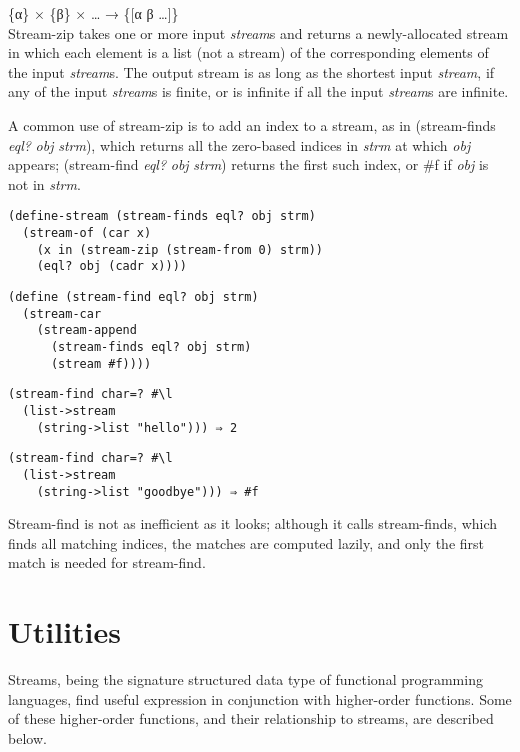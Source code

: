 \begin{entry}{%
  }

  \{α\} × \{β\} × \ldots{} → \{{[}α β \ldots{}{]}\}\\
  Stream-zip takes one or more input \emph{stream}s and returns a
  newly-allocated stream in which each element is a list (not a
  stream) of the corresponding elements of the input
  \emph{stream}s. The output stream is as long as the shortest input
  \emph{stream}, if any of the input \emph{stream}s is finite, or is
  infinite if all the input \emph{stream}s are infinite.

  A common use of stream-zip is to add an index to a stream, as in
  (stream-finds \emph{eql?} \emph{obj} \emph{strm}), which returns all
  the zero-based indices in \emph{strm} at which \emph{obj} appears;
  (stream-find \emph{eql?} \emph{obj} \emph{strm}) returns the first
  such index, or \#f if \emph{obj} is not in \emph{strm}.

\begin{verbatim}
(define-stream (stream-finds eql? obj strm)
  (stream-of (car x)
    (x in (stream-zip (stream-from 0) strm))
    (eql? obj (cadr x))))
\end{verbatim}

\begin{verbatim}
(define (stream-find eql? obj strm)
  (stream-car
    (stream-append
      (stream-finds eql? obj strm)
      (stream #f))))
\end{verbatim}

\begin{verbatim}
(stream-find char=? #\l
  (list->stream
    (string->list "hello"))) ⇒ 2
\end{verbatim}

\begin{verbatim}
(stream-find char=? #\l
  (list->stream
    (string->list "goodbye"))) ⇒ #f
\end{verbatim}

  Stream-find is not as inefficient as it looks; although it calls
  stream-finds, which finds all matching indices, the matches are
  computed lazily, and only the first match is needed for stream-find.
\end{entry}

\section{Utilities}\label{utilities}

Streams, being the signature structured data type of functional
programming languages, find useful expression in conjunction with
higher-order functions. Some of these higher-order functions, and their
relationship to streams, are described below.

